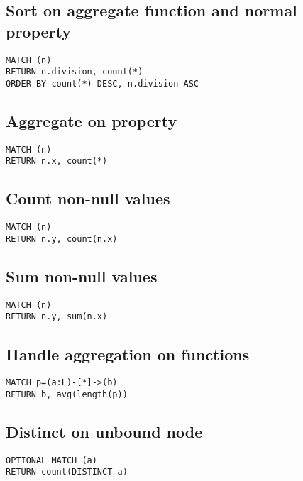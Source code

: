 \subsection{Sort on aggregate function and normal property}

\begin{lstlisting}
MATCH (n)
RETURN n.division, count(*)
ORDER BY count(*) DESC, n.division ASC
\end{lstlisting}

\subsection{Aggregate on property}

\begin{lstlisting}
MATCH (n)
RETURN n.x, count(*)
\end{lstlisting}

\subsection{Count non-null values}

\begin{lstlisting}
MATCH (n)
RETURN n.y, count(n.x)
\end{lstlisting}

\subsection{Sum non-null values}

\begin{lstlisting}
MATCH (n)
RETURN n.y, sum(n.x)
\end{lstlisting}

\subsection{Handle aggregation on functions}

\begin{lstlisting}
MATCH p=(a:L)-[*]->(b)
RETURN b, avg(length(p))
\end{lstlisting}

\subsection{Distinct on unbound node}

\begin{lstlisting}
OPTIONAL MATCH (a)
RETURN count(DISTINCT a)
\end{lstlisting}

